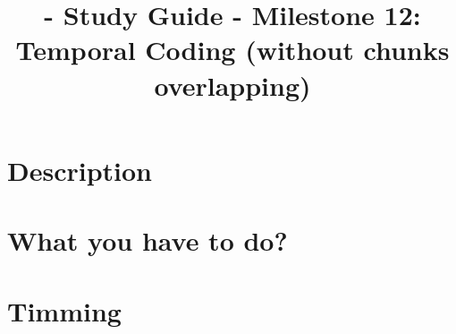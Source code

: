 
\title{\TM{} - Study Guide - Milestone 12: Temporal Coding (without chunks overlapping)}

\maketitle

\section{Description}

  
\section{What you have to do?}




\section{Timming}

